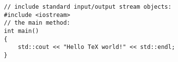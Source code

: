 \documentclass[border={10pt 10pt 30pt 10pt}]{standalone}
\begin{document}
\begin{lstlisting}
// include standard input/output stream objects:
#include <iostream>
// the main method:
int main()
{
    std::cout << "Hello TeX world!" << std::endl;
}
\end{lstlisting}
\end{document}

